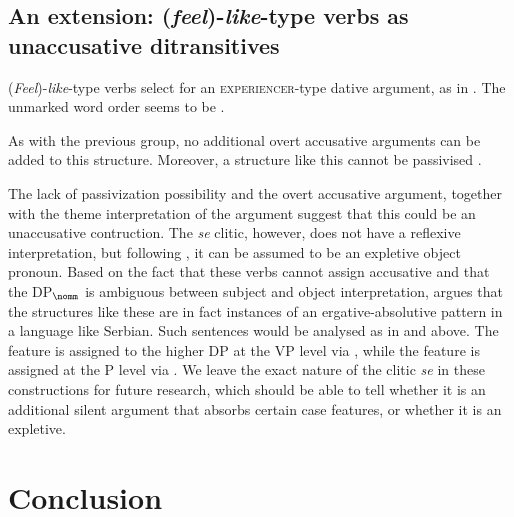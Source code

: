 \documentclass[output=paper,
modfonts,
newtxmath,
hidelinks
]{langscibook}
\begin{document}
\subsection{An extension: (\textit{feel})-\textit{like}-type verbs as unaccusative ditransitives}

(\textit{Feel})-\textit{like}-type verbs select for an \textsc{experiencer}-type dative argument, as in . The unmarked word order seems to be \datt{} \before{} \nomm.

\label{ex38}
\z

\noindent As with the previous group, no additional overt accusative arguments can be added to this structure. Moreover, a structure like this cannot be passivised . 

\label{ex39}
\z

\noindent The lack of passivization possibility and the overt accusative argument, together with the theme interpretation of the \nomm{} argument suggest that this could be an unaccusative contruction. The \textit{se} clitic, however, does not have a reflexive interpretation, but following \citet{progovac13}, it can be assumed to be an expletive object pronoun. Based on the fact that these verbs cannot assign accusative and that the DP$_{\nomm}$ is ambiguous between subject and object interpretation, \citet{progovac13} argues that the structures like these are in fact instances of an ergative-absolutive pattern in a language like Serbian. Such sentences would be analysed as in  and  above. The \lr{} feature is assigned to the higher DP at the VP level via \down, while the \hr{} feature is assigned at the \littlev{}P level via \up. We leave the exact nature of the clitic \textit{se} in these constructions for future research, which should be able to tell whether it is an additional silent argument that absorbs certain case features, or whether it is an expletive.	

\section{Conclusion}
\end{document}
